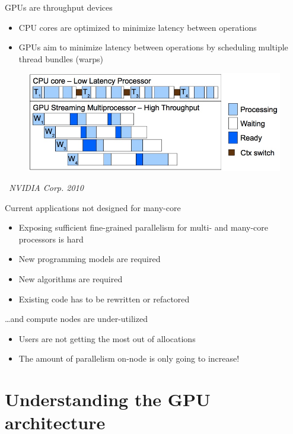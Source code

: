 \documentclass[aspectratio=169,12pt]{beamer}
\begin{document}
\begin{frame}{GPUs are throughput devices}
  \begin{itemize}
  \item CPU cores are optimized to minimize latency between operations
  \item GPUs aim to minimize latency between operations by scheduling multiple thread bundles (warps)
  \end{itemize}
  \begin{figure}
    \centering
    \includegraphics[width=.7\textwidth]{latency.jpg}
  \end{figure}
  \begin{flushright}
    \vspace{-\baselineskip}
    \raggedleft
    \scriptsize
    \emph{\textcopyright\ NVIDIA Corp. 2010}
  \end{flushright}
\end{frame}

\begin{frame}{Current applications not designed for many-core}
  \begin{itemize}
  \item Exposing sufficient fine-grained parallelism for multi- and many-core processors is hard
  \item New programming models are required
  \item New algorithms are required
  \item Existing code has to be rewritten or refactored
  \end{itemize}
  \pause
  \dots and compute nodes are under-utilized
  \begin{itemize}
  \item Users are not getting the most out of allocations
  \item The amount of parallelism on-node is only going to increase!
  \end{itemize}
\end{frame}


\part{Understanding the GPU architecture}
\end{document}

